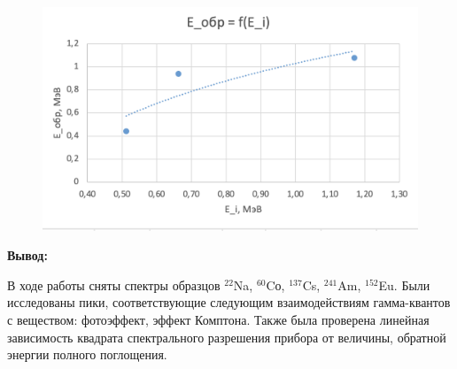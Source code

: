 \documentclass[a4paper, 12pt]{article}%
\begin{document}
\begin{enumerate}
\begin{figure}[h!]
	\centering
	\includegraphics[scale=0.85]{График_4.PNG}
\end{figure}

\end{enumerate}

\textbf{Вывод:}\\\par

В ходе работы сняты спектры образцов $^{22}$Na,  $^{60}$Cо,  $^{137}$Cs, $^{241}$Am, $^{152}$Eu.  Были исследованы пики, соответствующие следующим взаимодействиям гамма-квантов с веществом: фотоэффект, эффект Комптона.  Также была проверена линейная зависимость квадрата спектрального разрешения прибора от величины, обратной энергии полного поглощения.
\end{document}
